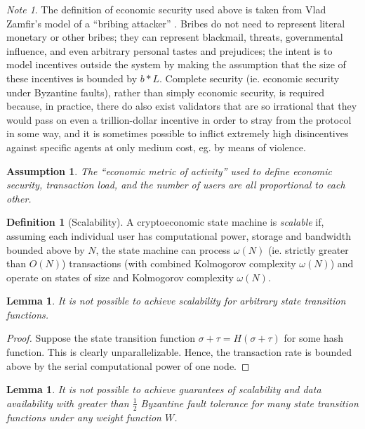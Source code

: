 \documentclass[11pt,a4paper]{report}
\theoremstyle{plain}
\newtheorem{lem}[thm]{Lemma}
\newtheorem{assm}{Assumption}[chapter]
\theoremstyle{definition}
\newtheorem{defn}{Definition}[chapter]
\theoremstyle{remark}
\newtheorem*{note}{Note}
\begin{document}
\begin{note}
The definition of economic security used above is taken from Vlad Zamfir's model of a ``bribing attacker'' \cite{zamfir}. Bribes do not need to represent literal monetary or other bribes; they can represent blackmail, threats, governmental influence, and even arbitrary personal tastes and prejudices; the intent is to model incentives outside the system by making the assumption that the size of these incentives is bounded by $b * L$. Complete security (ie. economic security under Byzantine faults), rather than simply economic security, is required because, in practice, there do also exist validators that are so irrational that they would pass on even a trillion-dollar incentive in order to stray from the protocol in some way, and it is sometimes possible to inflict extremely high disincentives against specific agents at only medium cost, eg. by means of violence.
\end{note}

\begin{assm}
The ``economic metric of activity'' used to define economic security, transaction load, and the number of users are all proportional to each other.
\end{assm}

\begin{defn}[Scalability]
A cryptoeconomic state machine is \emph{scalable} if, assuming each individual user has computational power, storage and bandwidth bounded above by $N$, the state machine can process $\omega(N)$ (ie. strictly greater than $O(N)$) transactions (with combined Kolmogorov complexity $\omega(N)$) and operate on states of size and Kolmogorov complexity $\omega(N)$.
\end{defn}

\begin{lem}
It is not possible to achieve scalability for arbitrary state transition functions.
\end{lem}
\begin{proof}
Suppose the state transition function $\sigma + \tau = H(\sigma + \tau)$ for some hash function. This is clearly unparallelizable. Hence, the transaction rate is bounded above by the serial computational power of one node.
\end{proof}

\begin{lem}
It is not possible to achieve guarantees of scalability and data availability with greater than $\frac{1}{2}$ Byzantine fault tolerance for many state transition functions under any weight function $W$.
\end{lem}
\end{document}
